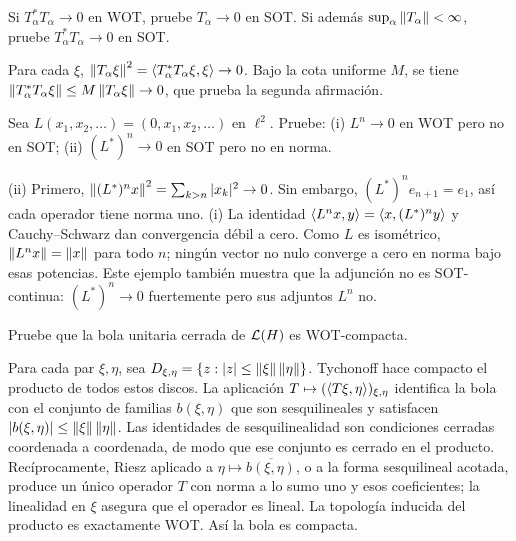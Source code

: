 \begin{ejercicio}\label{ej:v3-l31-2}
Si $T_\alpha^*T_\alpha\to0$ en WOT, pruebe $T_\alpha\to0$ en SOT. Si además $\sup_\alpha\left\lVert T_\alpha\right\rVert<\infty$, pruebe $T_\alpha^*T_\alpha\to0$ en SOT.
\end{ejercicio}
\begin{solucion}
Para cada $\xi$, $\left\lVert T_\alpha\xi\right\rVert^2=\left\langle T_\alpha^*T_\alpha\xi,\xi\right\rangle\to0$. Bajo la cota uniforme $M$, se tiene $\left\lVert T_\alpha^*T_\alpha\xi\right\rVert\le M\left\lVert T_\alpha\xi\right\rVert\to0$, que prueba la segunda afirmación.
\end{solucion}

\begin{ejercicio}\label{ej:v3-l31-3}
Sea $L(x_1,x_2,\ldots)=(0,x_1,x_2,\ldots)$ en $\ell^2$. Pruebe: (i) $L^n\to0$ en WOT pero no en SOT; (ii) $(L^*)^n\to0$ en SOT pero no en norma.
\end{ejercicio}
\begin{solucion}
(ii) Primero, $\left\lVert(L^*)^nx\right\rVert^2=\sum_{k>n}|x_k|^2\to0$. Sin embargo, $(L^*)^ne_{n+1}=e_1$, así cada operador tiene norma uno. (i) La identidad $\left\langle L^nx,y\right\rangle=\left\langle x,(L^*)^ny\right\rangle$ y Cauchy--Schwarz dan convergencia débil a cero. Como $L$ es isométrico, $\left\lVert L^nx\right\rVert=\left\lVert x\right\rVert$ para todo $n$; ningún vector no nulo converge a cero en norma bajo esas potencias. Este ejemplo también muestra que la adjunción no es SOT-continua: $(L^*)^n\to0$ fuertemente pero sus adjuntos $L^n$ no.
\end{solucion}

\begin{ejercicio}\label{ej:v3-l31-4}
Pruebe que la bola unitaria cerrada de $\mathcal L(H)$ es WOT-compacta.
\end{ejercicio}
\begin{solucion}
Para cada par $\xi,\eta$, sea $D_{\xi,\eta}=\{z:|z|\le\left\lVert\xi\right\rVert\left\lVert\eta\right\rVert\}$. Tychonoff hace compacto el producto de todos estos discos. La aplicación $T\mapsto(\left\langle T\xi,\eta\right\rangle)_{\xi,\eta}$ identifica la bola con el conjunto de familias $b(\xi,\eta)$ que son sesquilineales y satisfacen $|b(\xi,\eta)|\le\left\lVert\xi\right\rVert\left\lVert\eta\right\rVert$. Las identidades de sesquilinealidad son condiciones cerradas coordenada a coordenada, de modo que ese conjunto es cerrado en el producto. Recíprocamente, Riesz aplicado a $\eta\mapsto\overline{b(\xi,\eta)}$, o a la forma sesquilineal acotada, produce un único operador $T$ con norma a lo sumo uno y esos coeficientes; la linealidad en $\xi$ asegura que el operador es lineal. La topología inducida del producto es exactamente WOT. Así la bola es compacta.
\end{solucion}

